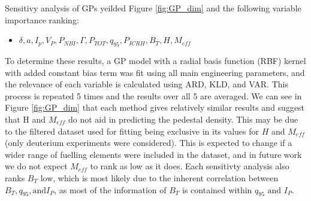 \documentclass[a4paper, twoside, final, 12pt]{article}
\begin{document}
{Sensitivy analysis of GPs yeilded Figure \ref{fig:GP_dim} and the following variable importance ranking: 
\begin{itemize}
	\item  $\delta, a, I_p, V_P, P_{NBI},\Gamma, P_{TOT},  q_{95},  P_{ICRH}, B_T, H, M_{eff}$
\end{itemize}
To determine these results, a GP model with a radial basis function (RBF) kernel with added constant bias term was fit using all main engineering parameters, and the relevance of each variable is calculated using ARD, KLD, and VAR. This process is repeated 5 times and the results over all 5 are averaged. We can see in Figure \ref{fig:GP_dim} that each method gives relatively similar results and suggest that H and $M_{eff}$ do not aid in predicting the pedestal density. This may be due to the filtered dataset used for fitting being exclusive in its values for $H$ and $M_{eff}$ (only deuterium experiments were considered). This is expected to change if a wider range of fuelling elements were included in the dataset, and in future work we do not expect $M_{eff}$ to rank as low as it does. Each sensitivty analysis also ranks $B_T$ low, which is most likely due to the inherent correlation between $B_T, q_{95}, \text{and} I_P$, as most of the information of $B_T$ is contained within $q_{95} \text{ and } I_P$. 

}
\end{document}
